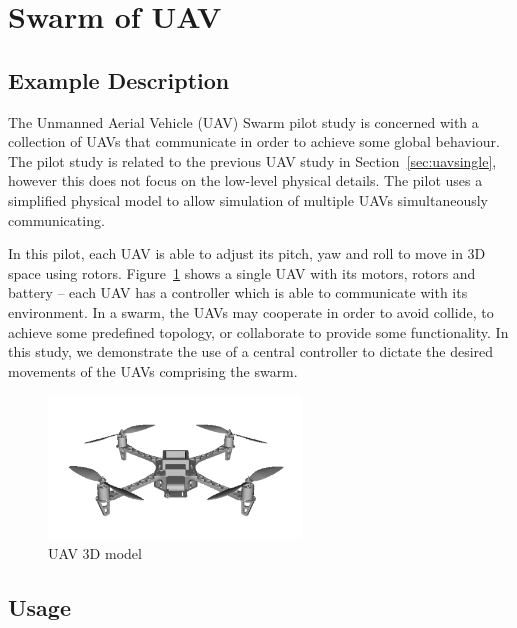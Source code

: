 \section{Swarm of UAV}
\label{sec:uavswarm}

\subsection{Example Description}
\label{sec:uavswarm_desc}

The Unmanned Aerial Vehicle (UAV) Swarm pilot study is concerned with a collection of UAVs that communicate in order to achieve some global behaviour. The pilot study is related to the previous UAV study in Section~\ref{sec:uavsingle}, however this does not focus on the low-level physical details. The pilot uses a simplified physical model to allow simulation of multiple UAVs simultaneously communicating.

In this pilot, each UAV is able to adjust its pitch, yaw and roll to move in 3D space using rotors. Figure~\ref{fig:single_uav} shows a single UAV with its motors, rotors and battery -- each UAV has a controller which is able to communicate with its environment. In a swarm, the UAVs may cooperate in order to avoid collide, to achieve some predefined topology, or collaborate to provide some functionality. In this study, we demonstrate the use of a central controller to dictate the desired movements of the UAVs comprising the swarm.

\begin{figure}[htbp]
\begin{center}
\includegraphics[width=0.6\textwidth]{uavswarm/uav}
\caption{UAV 3D model}
\label{fig:single_uav}
\end{center}
\end{figure}

\subsection{Usage}
\label{sec:uavswarm_usage}

